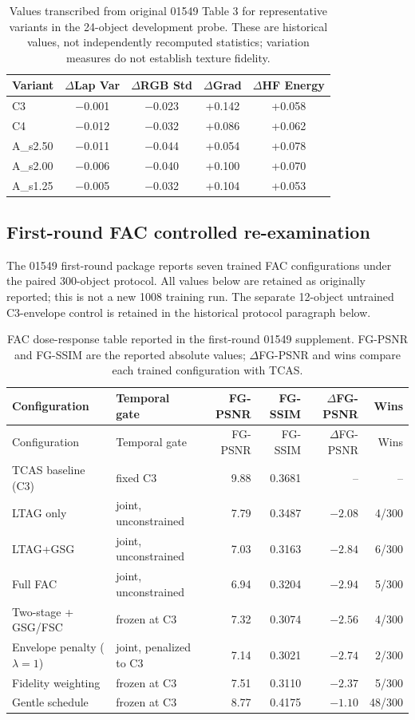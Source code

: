 \documentclass[11pt]{article}
\begin{document}
\begin{table}[ht]
\centering\small
\caption{Values transcribed from original 01549 Table 3 for representative variants in the 24-object development probe. These are historical values, not independently recomputed statistics; variation measures do not establish texture fidelity.}\label{tab:historical-table3}
\begin{tabular}{lcccc}
\toprule
Variant & $\Delta$Lap Var & $\Delta$RGB Std & $\Delta$Grad & $\Delta$HF Energy \\
\midrule
C3 & $-$0.001 & $-$0.023 & +0.142 & +0.058 \\
C4 & $-$0.012 & $-$0.032 & +0.086 & +0.062 \\
A\_s2.50 & $-$0.011 & $-$0.044 & +0.054 & +0.078 \\
A\_s2.00 & $-$0.006 & $-$0.040 & +0.100 & +0.070 \\
A\_s1.25 & $-$0.005 & $-$0.032 & +0.104 & +0.053 \\
\bottomrule
\end{tabular}
\end{table}

\clearpage
\subsection*{First-round FAC controlled re-examination}
The 01549 first-round package reports seven trained FAC configurations under the paired 300-object protocol. All values below are retained as originally reported; this is not a new 1008 training run. The separate 12-object untrained C3-envelope control is retained in the historical protocol paragraph below.

\begin{longtable}{p{3.3cm}p{3.5cm}rrrr}
\caption{FAC dose-response table reported in the first-round 01549 supplement. FG-PSNR and FG-SSIM are the reported absolute values; $\Delta$FG-PSNR and wins compare each trained configuration with TCAS.}\label{tab:fac-dose-response}\\
\toprule
Configuration & Temporal gate & FG-PSNR & FG-SSIM & $\Delta$FG-PSNR & Wins \\
\midrule\endfirsthead
\toprule
Configuration & Temporal gate & FG-PSNR & FG-SSIM & $\Delta$FG-PSNR & Wins \\
\midrule\endhead
TCAS baseline (C3) & fixed C3 & 9.88 & 0.3681 & -- & -- \\
LTAG only & joint, unconstrained & 7.79 & 0.3487 & $-2.08$ & 4/300 \\
LTAG+GSG & joint, unconstrained & 7.03 & 0.3163 & $-2.84$ & 6/300 \\
Full FAC & joint, unconstrained & 6.94 & 0.3204 & $-2.94$ & 5/300 \\
Two-stage + GSG/FSC & frozen at C3 & 7.32 & 0.3074 & $-2.56$ & 4/300 \\
Envelope penalty ($\lambda=1$) & joint, penalized to C3 & 7.14 & 0.3021 & $-2.74$ & 2/300 \\
Fidelity weighting & frozen at C3 & 7.51 & 0.3110 & $-2.37$ & 5/300 \\
Gentle schedule & frozen at C3 & 8.77 & 0.4175 & $-1.10$ & 48/300 \\
\bottomrule
\end{longtable}
\end{document}
